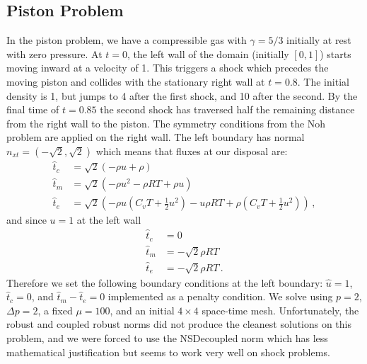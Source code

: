 \documentclass[Dissertation.tex]{subfiles}
\begin{document}
\subsection{Piston Problem}
\label{sec:piston}
In the piston problem, we have a compressible gas with $\gamma=5/3$ initially at rest with zero pressure.
At $t=0$, the left wall of the domain (initially $[0,1]$) starts moving inward at a velocity of 1.
This triggers a shock which precedes the moving piston and collides with the stationary right wall 
at $t=0.8$. The initial density is 1, but jumps to 4 after the first shock, and 10 after the second.
By the final time of $t=0.85$ the second shock has traversed half the remaining distance from
the right wall to the piston.
The symmetry conditions from the Noh problem are applied on the right wall. 
The left boundary has normal $n_{xt}=(-\sqrt{2},\sqrt{2})$ which means that fluxes at our disposal are:
\begin{align*}
\hat t_c&=\sqrt{2}(-\rho u+\rho)\\
\hat t_m&=\sqrt{2}(-\rho u^2-\rho RT+\rho u)\\
\hat t_e&=\sqrt{2}(-\rho u(C_vT+\frac{1}{2}u^2)-u\rho RT+\rho(C_vT+\frac{1}{2}u^2))\,,
\end{align*}
and since $u=1$ at the left wall
\begin{align*}
\hat t_c&=0\\
\hat t_m&=-\sqrt{2}\rho RT\\
\hat t_e&=-\sqrt{2}\rho RT\,.
\end{align*}
Therefore we set the following boundary conditions at the left boundary: $\hat u=1$, $\hat t_c=0$, 
and $\hat t_m-\hat t_e=0$ implemented as a penalty condition.
We solve using $p=2$, $\Delta p=2$, a fixed $\mu=100$, and an initial $4\times4$ space-time mesh.
Unfortunately, the robust and coupled robust norms did not produce the cleanest solutions
on this problem, and we were forced to use the NSDecoupled norm which has
less mathematical justification but seems to work very well on shock problems.
\end{document}

